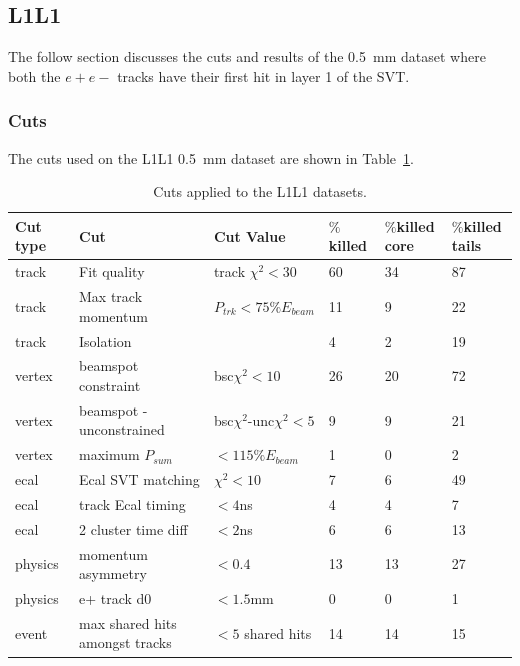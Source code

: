\subsection{L1L1}

The follow section discusses the cuts and results of the 0.5~mm dataset where both the $e+e-$ tracks have their first hit in layer 1 of the SVT. 

\subsubsection{Cuts}
The cuts used on the L1L1 0.5~mm dataset are shown in Table~\ref{tab:l1l1_cuts}.

\begin{table}[H]
\caption{Cuts applied to the L1L1 datasets.}
\label{tab:l1l1_cuts}
\centering
\begin{tabular}{llllll}
\toprule
Cut type & Cut & Cut Value &  $\%$killed &  $\%$killed core & $\%$killed tails\\
\midrule
track & Fit quality & track $\chi^{2}<30$ & 60 & 34 & 87 \\
track & Max track momentum &  $P_{trk}<75\%E_{beam}$ & 11 & 9 & 22 \\
track & Isolation &   & 4 & 2 & 19 \\
vertex & beamspot constraint & bsc$\chi^{2}<10$  & 26 & 20 & 72 \\
vertex & beamspot - unconstrained & bsc$\chi^{2}$-unc$\chi^2<5$  & 9 & 9 & 21 \\
vertex & maximum $P_{sum}$ &  $<115\%E_{beam}$ & 1 & 0 & 2 \\
ecal & Ecal SVT matching & $\chi^2<10$  & 7 & 6 & 49 \\
ecal & track Ecal timing & $<4$ns  & 4 & 4 & 7 \\
ecal & 2 cluster time diff & $<2$ns  & 6 & 6 & 13 \\
physics & momentum asymmetry & $<0.4$  & 13 & 13 & 27 \\
physics & e+ track d0 & $<1.5$mm  & 0 & 0 & 1 \\
event & max shared hits amongst tracks & $<5$ shared hits  & 14 & 14 & 15 \\
\bottomrule
\end{tabular}
\end{table}


